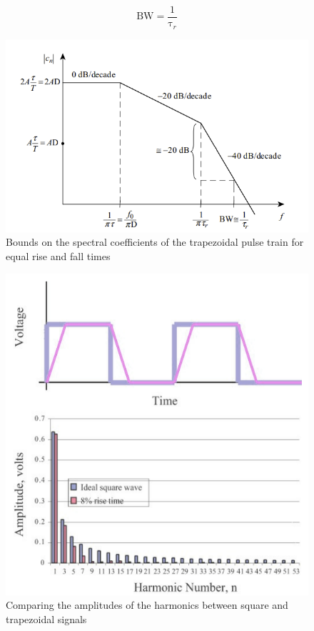 \documentclass[final]{cubedoc}
\begin{document}
	\[\text{BW} = \frac{1}{\text{τ}_r}\]
	
	\begin{figure}[h!]
		\centering
		\includegraphics[keepaspectratio, width = \textwidth, height=.35\textheight]{assets/magnitude_clock.png}
		\caption{Bounds on the spectral coefficients of the trapezoidal pulse train for equal rise and fall times \cite[p.16]{paul2011transmission}}
	\end{figure}
	
	\begin{figure}[h!]
		\centering
		\includegraphics[keepaspectratio, height = .4\textheight, width = \textwidth]{assets/square_n_trapezoidal.png}
		\caption{Comparing the amplitudes of the harmonics between square and trapezoidal signals \cite{bogatin2009signal}}
	\end{figure}
	
\end{document}
